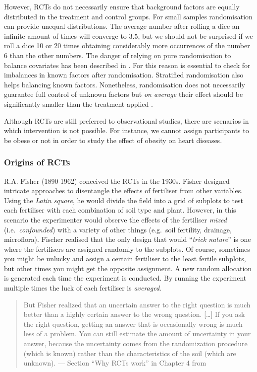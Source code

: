 \documentclass[
]{book}
\begin{document}
However, RCTs do not necessarily ensure that background factors are equally distributed in the treatment and control groups. For small samples randomisation can provide unequal distributions. The average number after rolling a dice an infinite amount of times will converge to 3.5, but we should not be surprised if we roll a dice 10 or 20 times obtaining considerably more occurrences of the number 6 than the other numbers. The danger of relying on pure randomisation to balance covariates has been described in \citep{krause2003random} \citep{morgan2012rerandomization}. For this reason is essential to check for imbalances in known factors after randomisation. Stratified randomisation also helps balancing known factors. Nonetheless, randomisation does not necessarily guarantee full control of unknown factors but \emph{on average} their effect should be significantly smaller than the treatment applied \citep{deaton2018understanding}.

Although RCTs are still preferred to observational studies, there are scenarios in which intervention is not possible. For instance, we cannot assign participants to be obese or not in order to study the effect of obesity on heart diseases.

\hypertarget{origins-of-rcts}{%
\subsubsection{Origins of RCTs}\label{origins-of-rcts}}

R.A. Fisher (1890-1962) conceived the RCTs in the 1930s. Fisher designed intricate approaches to disentangle the effects of fertiliser from other variables. Using the \emph{Latin square}, he would divide the field into a grid of subplots to test each fertiliser with each combination of soil type and plant. However, in this scenario the experimenter would observe the effects of the fertiliser \emph{mixed} (i.e.~\emph{confounded}) with a variety of other things (e.g.~soil fertility, drainage, microflora). Fischer realised that the only design that would ``\emph{trick nature}'' is one where the fertilisers are assigned randomly to the subplots. Of course, sometimes you might be unlucky and assign a certain fertiliser to the least fertile subplots, but other times you might get the opposite assignment. A new random allocation is generated each time the experiment is conducted. By running the experiment multiple times the luck of each fertiliser is \emph{averaged}.

\begin{quote}
But Fisher realized that an uncertain answer to the right question is much better than a highly certain answer to the wrong question. {[}\ldots{]} If you ask the right question, getting an answer that is occasionally wrong is much less of a problem. You can still estimate the amount of uncertainty in your answer, because the uncertainty comes from the randomization procedure (which is known) rather than the characteristics of the soil (which are unknown). --- Section ``Why RCTs work'' in Chapter 4 from \citep{book-of-why}
\end{quote}
\end{document}
